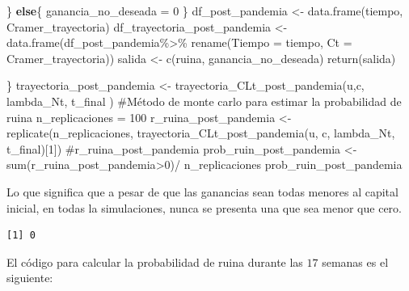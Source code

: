 \documentclass[
  us-letterpaper,
]{scrreprt}
\newenvironment{Shaded}{\begin{snugshade}}{\end{snugshade}}
\newcommand{\AttributeTok}[1]{\textcolor[rgb]{0.40,0.45,0.13}{#1}}
\newcommand{\CommentTok}[1]{\textcolor[rgb]{0.37,0.37,0.37}{#1}}
\newcommand{\ControlFlowTok}[1]{\textcolor[rgb]{0.00,0.23,0.31}{\textbf{#1}}}
\newcommand{\DecValTok}[1]{\textcolor[rgb]{0.68,0.00,0.00}{#1}}
\newcommand{\FunctionTok}[1]{\textcolor[rgb]{0.28,0.35,0.67}{#1}}
\newcommand{\NormalTok}[1]{\textcolor[rgb]{0.00,0.23,0.31}{#1}}
\newcommand{\OtherTok}[1]{\textcolor[rgb]{0.00,0.23,0.31}{#1}}
\newcommand{\SpecialCharTok}[1]{\textcolor[rgb]{0.37,0.37,0.37}{#1}}
\theoremstyle{plain}
\theoremstyle{plain}
\theoremstyle{definition}
\theoremstyle{remark}
\begin{document}
\begin{Shaded}
\begin{Highlighting}[]
\NormalTok{  \} }
  \ControlFlowTok{else}\NormalTok{\{}
\NormalTok{    ganancia\_no\_deseada }\OtherTok{=} \DecValTok{0}
\NormalTok{  \}}
\NormalTok{  df\_post\_pandemia }\OtherTok{\textless{}{-}} \FunctionTok{data.frame}\NormalTok{(tiempo, Cramer\_trayectoria)}
\NormalTok{  df\_trayectoria\_post\_pandemia }\OtherTok{\textless{}{-}} \FunctionTok{data.frame}\NormalTok{(df\_post\_pandemia}\SpecialCharTok{\%\textgreater{}\%} 
                                  \FunctionTok{rename}\NormalTok{(}\AttributeTok{Tiempo =}\NormalTok{ tiempo, }
                                  \AttributeTok{Ct =}\NormalTok{ Cramer\_trayectoria))}
\NormalTok{  salida }\OtherTok{\textless{}{-}} \FunctionTok{c}\NormalTok{(ruina, ganancia\_no\_deseada)}
  \FunctionTok{return}\NormalTok{(salida)}
  
\NormalTok{\}}
\NormalTok{trayectoria\_post\_pandemia }\OtherTok{\textless{}{-}} \FunctionTok{trayectoria\_CLt\_post\_pandemia}\NormalTok{(u,c,}
\NormalTok{                                            lambda\_Nt, t\_final )}
\CommentTok{\#Método de monte carlo para estimar la probabilidad de ruina}
\NormalTok{n\_replicaciones }\OtherTok{=} \DecValTok{100}
\NormalTok{r\_ruina\_post\_pandemia }\OtherTok{\textless{}{-}} \FunctionTok{replicate}\NormalTok{(n\_replicaciones,}
          \FunctionTok{trayectoria\_CLt\_post\_pandemia}\NormalTok{(u, c, lambda\_Nt, t\_final)[}\DecValTok{1}\NormalTok{])}
\CommentTok{\#r\_ruina\_post\_pandemia}
\NormalTok{prob\_ruin\_post\_pandemia }\OtherTok{\textless{}{-}} \FunctionTok{sum}\NormalTok{(r\_ruina\_post\_pandemia}\SpecialCharTok{\textgreater{}}\DecValTok{0}\NormalTok{)}\SpecialCharTok{/}
\NormalTok{n\_replicaciones}
\NormalTok{prob\_ruin\_post\_pandemia}
\end{Highlighting}
\end{Shaded}

Lo que significa que a pesar de que las ganancias sean todas menores al
capital inicial, en todas la simulaciones, nunca se presenta una que sea
menor que cero.

\begin{verbatim}
[1] 0
\end{verbatim}

El código para calcular la probabilidad de ruina durante las \(17\)
semanas es el siguiente:
\end{document}
